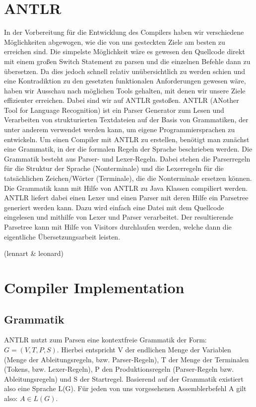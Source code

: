 \documentclass[paper=a4,fontsize=12pt,twocolumn]{scrreprt}
\begin{document}
\section{ANTLR}
In der Vorbereitung für die Entwicklung des Compilers haben wir verschiedene Möglichkeiten abgewogen, wie die von uns gesteckten Ziele am besten zu erreichen sind.
Die simpelste Möglichkeit wäre es gewesen den Quellcode direkt mit einem großen Switch Statement zu parsen und die einzelnen Befehle dann zu übersetzen.
Da dies jedoch schnell relativ unübersichtlich zu werden schien und eine Kontradiktion zu den gesetzten funktionalen Anforderungen gewesen wäre, haben wir Ausschau nach möglichen Tools gehalten, mit denen wir unsere Ziele effizienter erreichen.
Dabei sind wir auf ANTLR gestoßen.
ANTLR (ANother Tool for Language Recognition) ist ein Parser Generator zum Lesen und Verarbeiten von strukturierten Textdateien auf der Basis von Grammatiken, der unter anderem verwendet werden kann, um eigene Programmiersprachen zu entwickeln.
Um einen Compiler mit ANTLR zu erstellen, benötigt man zunächst eine Grammatik, in der die formalen Regeln der Sprache beschrieben werden.
Die Grammatik besteht aus Parser- und Lexer-Regeln.
Dabei stehen die Parserregeln für die Struktur der Sprache (Nonterminale) und die Lexerregeln für die tatsächlichen Zeichen/Wörter (Terminale), die die Nonterminale ersetzen können.
Die Grammatik kann mit Hilfe von ANTLR zu Java Klassen compiliert werden.
ANTLR liefert dabei einen Lexer und einen Parser mit deren Hilfe ein Parsetree generiert werden kann.
Dazu wird einfach eine Datei mit dem Quellcode eingelesen und mithilfe von Lexer und Parser verarbeitet.
Der resultierende Parsetree kann mit Hilfe von Visitors durchlaufen werden,
welche dann die eigentliche Übersetzungsarbeit leisten.

(lennart & leonard)

\section{Compiler Implementation}

\subsection{Grammatik}
ANTLR nutzt zum Parsen eine kontextfreie Grammatik der Form: $G = (V, T, P, S)$. Hierbei entspricht V der endlichen Menge der Variablen (Menge der Ableitungsregeln, bzw. Parser-Regeln), T der Menge der Terminalen (Tokens, bzw. Lexer-Regeln), P den Produktionsregeln (Parser-Regeln bzw. Ableitungsregeln) und S der Startregel. Basierend auf der Grammatik existiert also eine Sprache L(G). Für jeden von uns vorgesehenen Assemblerbefehl A gilt also: $A \in L(G)$. 
\end{document}
